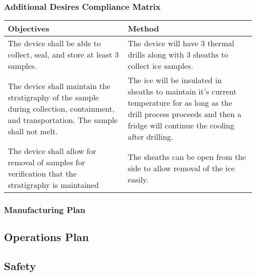 \documentclass{article}
\begin{document}
\subsubsection{Additional Desires Compliance Matrix}
\begin{center}
    \begin{tabulary}{\linewidth}{|L|L|}
    \hline
    Objectives & Method \\
    \hline
    The device shall be able to collect, seal, and store at least 3 samples. &
    The device will have 3 thermal drills along with 3 sheaths to collect ice samples. \\
    \hline
    The device shall maintain the stratigraphy of the sample during collection, containment, and transportation. The sample shall not melt. &
    The ice will be insulated in sheaths to maintain it's current temperature for as long as the drill process proceeds and then a fridge will continue the cooling after drilling. \\
    \hline
    The device shall allow for removal of samples for verification that the stratigraphy is maintained &
    The sheaths can be open from the side to allow removal of the ice easily. \\
    \hline
    \end{tabulary}
\end{center}
\subsubsection{Manufacturing Plan}
\subsection{Operations Plan}
\subsection{Safety}
\end{document}
